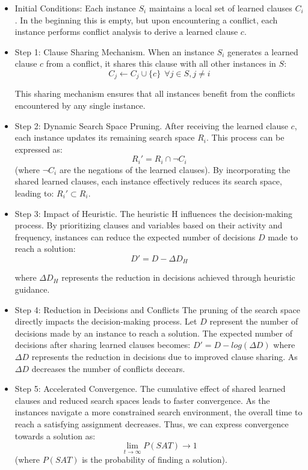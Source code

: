 \documentclass{article}
\begin{document}
\begin{itemize}
    \item Initial Conditions: Each instance $S_i$ maintains a local set of learned clauses $C_i$. In the beginning this is empty, but upon encountering a conflict, each instance performs conflict analysis to derive a learned clause $c$.
    \item Step 1: Clause Sharing Mechanism. When an instance $S_i$ generates a learned clause $c$ from a conflict, it shares this clause with all other instances in $S$: $$C_j \leftarrow C_j \cup \{ c \}\ \ \forall j \in S, j \neq i$$

    This sharing mechanism ensures that all instances benefit from the conflicts encountered by any single instance.
    \item Step 2: Dynamic Search Space Pruning. After receiving the learned clause $c$, each instance updates its remaining search space $R_i$. This process can be expressed as: $$R_i' = R_i \cap \neg C_i$$ (where $\neg C_i$ are the negations of the learned clauses). By incorporating the shared learned clauses, each instance effectively reduces its search space, leading to: $R_i' \subset R_i$.
    \item  Step 3: Impact of Heuristic. The heuristic H influences the decision-making process. By prioritizing clauses and variables based on their activity and frequency, instances can reduce the expected number of decisions $D$ made to reach a solution:
    $$D' = D - \Delta D_H$$

    where $\Delta D_H$ represents the reduction in decisions achieved through heuristic guidance.
    \item Step 4: Reduction in Decisions and Conflicts
    The pruning of the search space directly impacts the decision-making process. Let $D$ represent the number of decisions made by an instance to reach a solution. The expected number of decisions after sharing learned clauses becomes: $D'=D - log(\Delta D)$
    where $\Delta D$ represents the reduction in decisions due to improved clause sharing. As $\Delta D$ decreases the number of conflicts decears.

    \item Step 5: Accelerated Convergence. The cumulative effect of shared learned clauses and reduced search spaces leads to faster convergence. As the instances navigate a more constrained search environment, the overall time to reach a satisfying assignment decreases. Thus, we can express convergence towards a solution as: $$ \lim_{t \rightarrow \infty}P(SAT) \rightarrow 1 $$ (where $P(SAT)$ is the probability of finding a solution).
\end{itemize}
\end{document}
